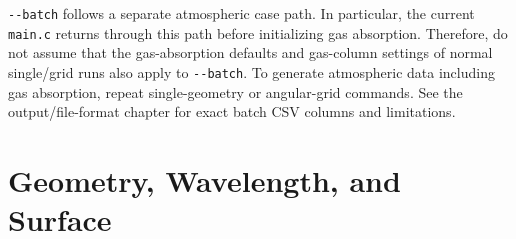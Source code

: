 \texttt{-\allowbreak{}-\allowbreak{}batch} follows a separate atmospheric case path. In particular, the current \texttt{main.\allowbreak{}c} returns through this path before initializing gas absorption. Therefore, do not assume that the gas-absorption defaults and gas-column settings of normal single/grid runs also apply to \texttt{-\allowbreak{}-\allowbreak{}batch}. To generate atmospheric data including gas absorption, repeat single-geometry or angular-grid commands. See the output/file-format chapter for exact batch CSV columns and limitations.

\section{Geometry, Wavelength, and Surface}
\label{sec:auto:03_options:2}



